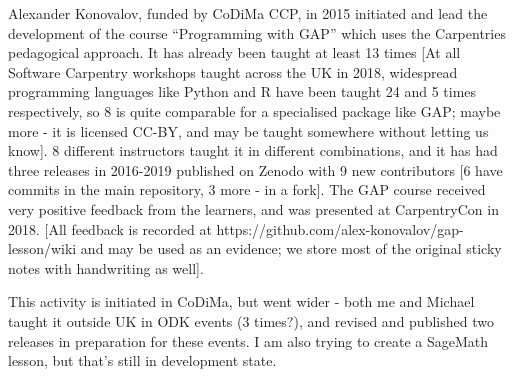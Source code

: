 \documentclass{deliverablereport}
\begin{document}
Alexander Konovalov, funded by CoDiMa CCP, in 2015 initiated and lead the development of the course “Programming with GAP” which uses the Carpentries pedagogical approach. It has already been taught at least 13 times [At all Software Carpentry workshops taught across the UK in 2018, widespread programming languages like Python and R have been taught 24 and 5 times respectively, so 8 is quite comparable for a specialised package like GAP;  maybe more - it is licensed CC-BY, and may be taught somewhere without letting us know]. 8 different instructors taught it in different combinations, and it has had three releases in 2016-2019 published on Zenodo with 9 new contributors [6 have commits in the main repository, 3 more - in a fork]. The GAP course received very positive feedback from the learners, and was presented at CarpentryCon in 2018. [All feedback is recorded at https://github.com/alex-konovalov/gap-lesson/wiki and may be used as an evidence; we store most of the original sticky notes with handwriting as well].

This activity is initiated in CoDiMa, but went wider - both me and Michael taught it outside UK in ODK events (3 times?), and revised and published two releases in preparation for these events. I am also trying to create a SageMath lesson, but that's still in development state.

  
\printbibliography
\end{document}
